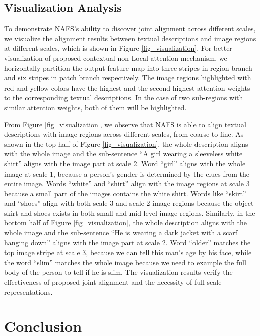\documentclass[final]{cvpr}
\begin{document}
\subsection{Visualization Analysis}
To demonstrate NAFS's ability to discover joint alignment across different scales, we visualize the alignment results between textual descriptions and image regions at different scales, which is shown in Figure \ref{fig_visualization}. For better visualization of proposed contextual non-Local attention mechanism, we horizontally partition the output feature map into three stripes in region branch and six stripes in patch branch respectively. The image regions highlighted with red and yellow colors have the highest and the second highest attention weights to the corresponding textual descriptions. In the case of two sub-regions with similar attention weights, both of them will be highlighted. 

From  Figure \ref{fig_visualization}, we observe that NAFS is able to align textual descriptions with image regions across different scales, from coarse to fine. As shown in the top half of Figure \ref{fig_visualization}, the whole description aligns with the whole image and the sub-sentence ``A girl wearing a sleeveless white shirt'' aligns with the image part at scale 2. Word ``girl'' aligns with the whole image at scale 1, because a person's gender is determined by the clues from the entire image. Words ``white'' and ``shirt'' align with the image regions at scale 3 because a small part of the images contains the white shirt. Words like ``skirt'' and ``shoes'' align with both scale 3 and scale 2 image regions because the object skirt and shoes exists in both small and mid-level image regions. 
Similarly, in the bottom half of Figure \ref{fig_visualization}, the whole description aligns with the whole image and the sub-sentence ``He is wearing a dark jacket with a scarf hanging down'' aligns with the image part at scale 2. Word ``older'' matches the top image stripe at scale 3, because we can tell this man's age by his face, while the word ``slim'' matches the whole image because we need to example the full body of the person to tell if he is slim.
The visualization results verify the effectiveness of proposed joint alignment and the necessity of full-scale representations.

\section{Conclusion}
\end{document}
